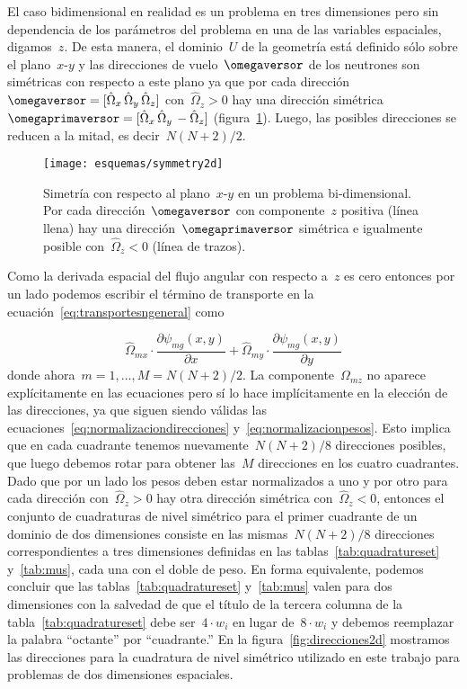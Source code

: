 El caso bidimensional en realidad es un problema en tres dimensiones pero sin dependencia de los parámetros del problema en una de las variables espaciales, digamos~$z$. De esta manera, el dominio~$U$ de la geometría está definido sólo sobre el plano~$x$-$y$ y las direcciones de vuelo~$\omegaversor$ de los neutrones son simétricas con respecto a este plano ya que por cada dirección~$\omegaversor = [\hat{\Omega}_x \, \hat{\Omega}_y \, \hat{\Omega}_z]$ con~$\hat{\Omega}_z>0$ hay una dirección simétrica~$\omegaprimaversor = [\hat{\Omega}_x \, \hat{\Omega}_y \, -\hat{\Omega}_z]$ (figura~\ref{fig:symmetry2d}). Luego, las posibles direcciones se reducen a la mitad, es decir~$N(N+2)/2$.

\begin{figure}
 \begin{center}
  \texttt{[image: esquemas/symmetry2d]}
 \end{center}
\caption{\label{fig:symmetry2d}Simetría con respecto al plano~$x$-$y$ en un problema bi-dimensional. Por cada dirección~$\omegaversor$ con componente~$z$ positiva (línea llena) hay una dirección~$\omegaprimaversor$ simétrica e igualmente posible con~$\hat{\Omega}_z<0$ (línea de trazos).}
\end{figure}


Como la derivada espacial del flujo angular con respecto a~$z$ es cero entonces por un lado podemos escribir el término de transporte en la ecuación~\eqref{eq:transportesngeneral} como

\begin{equation*}
 \hat{\Omega}_{mx} \cdot \frac{\partial{\psi_{mg}}(x,y)}{\partial x} + \hat{\Omega}_{my} \cdot \frac{\partial{\psi_{mg}(x,y)}}{\partial y}
\end{equation*}
% 
donde ahora~$m=1,\dots,M = N(N+2)/2$. La componente~${\Omega}_{mz}$ no aparece explícitamente en las ecuaciones pero sí lo hace implícitamente en la elección de las direcciones, ya que siguen siendo válidas las ecuaciones~\eqref{eq:normalizaciondirecciones} y~\eqref{eq:normalizacionpesos}. Esto implica que en cada cuadrante tenemos nuevamente~$N(N+2)/8$ direcciones posibles, que luego debemos rotar para obtener las~$M$ direcciones en los cuatro cuadrantes. Dado que por un lado los pesos deben estar normalizados a uno y por otro para cada dirección con~$\hat{\Omega}_z>0$ hay otra dirección simétrica con~$\hat{\Omega}_z<0$, entonces el conjunto de cuadraturas de nivel simétrico para el primer cuadrante de un dominio de dos dimensiones consiste en las mismas~$N(N+2)/8$ direcciones correspondientes a tres dimensiones definidas en las tablas~\ref{tab:quadratureset} y~\ref{tab:mus}, cada una con el doble de peso. En forma equivalente, podemos concluir que las tablas~\ref{tab:quadratureset} y~\ref{tab:mus} valen para dos dimensiones con la salvedad de que el título de la tercera columna de la tabla~\ref{tab:quadratureset} debe ser~$4\cdot w_i$ en lugar de~$8\cdot w_i$ y debemos reemplazar la palabra “octante” por “cuadrante.” En la figura~\ref{fig:direcciones2d} mostramos las direcciones para la cuadratura de nivel simétrico utilizado en este trabajo para problemas de dos dimensiones espaciales. 

